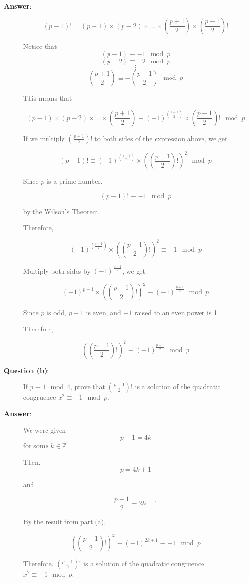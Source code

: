 \documentclass{article} %
\begin{document}
\pagebreak
\noindent
\textbf{Answer}:
\begin{quote}
    \[(p - 1)! = (p - 1) \times (p - 2) \times \dots \times \left(\frac{p + 1}{2}\right) \times \left(\frac{p - 1}{2}\right)!\]

    Notice that
    \[(p - 1) \equiv -1 \mod p\]
    \[(p - 2) \equiv -2 \mod p\]
    \[\vdots\]
    \[\left(\frac{p + 1}{2}\right) \equiv -\left(\frac{p - 1}{2}\right) \mod p\]

    This means that

    \[(p - 1) \times (p - 2) \times \dots \times \left(\frac{p + 1}{2}\right) \equiv (-1)^{\left(\frac{p - 1}{2}\right)} \times \left(\frac{p - 1}{2}\right)! \mod p\]

    If we multiply $\left(\frac{p -1}{2}\right)!$ to both sides of the expression above, we get

    \[(p - 1)! \equiv (-1)^{\left(\frac{p - 1}{2}\right)} \times \left(\left(\frac{p - 1}{2}\right)!\right)^2 \mod p\]

    Since $p$ is a prime number,

    \[(p - 1)! \equiv -1 \mod p\]

    by the Wilson's Theorem.

    Therefore,

    \[(-1)^{\left(\frac{p - 1}{2}\right)} \times \left(\left(\frac{p - 1}{2}\right)!\right)^2 \equiv -1 \mod p\]

    Multiply both sides by $(-1)^{\frac{p - 1}{2}}$, we get

    \[(-1)^{p - 1} \times \left(\left(\frac{p - 1}{2}\right)!\right)^2 \equiv (-1)^{\frac{p + 1}{2}} \mod p\]

    Since $p$ is odd, $p - 1$ is even, and $-1$ raised to an even power is 1.

    Therefore,

    \[\boxed{\left(\left(\frac{p - 1}{2}\right)!\right)^2 \equiv (-1)^{\frac{p + 1}{2}} \mod p}\]
\end{quote}

\pagebreak
\noindent
\textbf{Question (b)}:
\begin{quote}
    If $p \equiv 1 \mod 4$, prove that $\left(\frac{p-1}{2}\right)!$ is a solution of the quadratic congruence $x^2 \equiv -1 \mod p$.
\end{quote}

\bigskip
\noindent
\textbf{Answer}:
\begin{quote}
    We were given
    \[p - 1 = 4k\]
    for some $k \in \mathbb{Z}$

    Then,
    \[p = 4k + 1\]

    and

    \[\frac{p + 1}{2} = 2k + 1\]

    By the result from part (a),

    \[\left(\left(\frac{p - 1}{2}\right)!\right)^2 \equiv (-1)^{2k + 1} \equiv -1 \mod p\]

    Therefore, $\left(\frac{p-1}{2}\right)!$ is a solution of the quadratic congruence $x^2 \equiv -1 \mod p$.

\end{quote}
\end{document}
